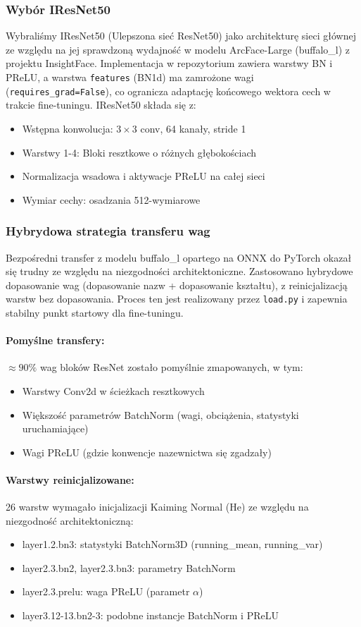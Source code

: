 \subsubsection{Wybór IResNet50}
Wybraliśmy IResNet50 (Ulepszona sieć ResNet50) jako architekturę sieci głównej ze względu na jej sprawdzoną wydajność w modelu ArcFace-Large (buffalo\_l) z projektu InsightFace. Implementacja w repozytorium zawiera warstwy BN i PReLU, a warstwa \texttt{features} (BN1d) ma zamrożone wagi (\texttt{requires\_grad=False}), co ogranicza adaptację końcowego wektora cech w trakcie fine-tuningu. IResNet50 składa się z:
\begin{itemize}
    \item Wstępna konwolucja: $3 \times 3$ conv, 64 kanały, stride 1
    \item Warstwy 1-4: Bloki resztkowe o różnych głębokościach
    \item Normalizacja wsadowa i aktywacje PReLU na całej sieci
    \item Wymiar cechy: osadzania 512-wymiarowe
\end{itemize}

\subsubsection{Hybrydowa strategia transferu wag}
Bezpośredni transfer z modelu buffalo\_l opartego na ONNX do PyTorch okazał się trudny ze względu na niezgodności architektoniczne. Zastosowano hybrydowe dopasowanie wag (dopasowanie nazw + dopasowanie kształtu), z reinicjalizacją warstw bez dopasowania. Proces ten jest realizowany przez \texttt{load.py} i zapewnia stabilny punkt startowy dla fine-tuningu.

\paragraph{Pomyślne transfery:} $\approx 90\%$ wag bloków ResNet zostało pomyślnie zmapowanych, w tym:
\begin{itemize}
    \item Warstwy Conv2d w ścieżkach resztkowych
    \item Większość parametrów BatchNorm (wagi, obciążenia, statystyki uruchamiające)
    \item Wagi PReLU (gdzie konwencje nazewnictwa się zgadzały)
\end{itemize}

\paragraph{Warstwy reinicjalizowane:} 26 warstw wymagało inicjalizacji Kaiming Normal (He) ze względu na niezgodność architektoniczną:
\begin{itemize}
    \item layer1.2.bn3: statystyki BatchNorm3D (running\_mean, running\_var)
    \item layer2.3.bn2, layer2.3.bn3: parametry BatchNorm
    \item layer2.3.prelu: waga PReLU (parametr $\alpha$)
    \item layer3.12-13.bn2-3: podobne instancje BatchNorm i PReLU
\end{itemize}

